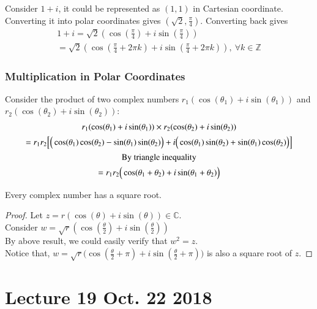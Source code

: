 \documentclass[10pt]{article}
\begin{document}
		\begin{example}
			Consider $1+i$, it could be represented as $(1,1)$ in Cartesian coordinate. Converting it into polar coordinates gives $(\sqrt{2}, \frac{\pi}{4})$. Converting back gives
			\begin{gather*}
				1 + i = \sqrt{2}(\cos(\frac{\pi}{4}) + i \sin(\frac{\pi}{4})) \\
				= \sqrt{2} (\cos(\frac{\pi}{4} + 2\pi k) + i \sin(\frac{\pi}{4} + 2 \pi k)),\ \forall k \in \mathbb{Z}
			\end{gather*}
		\end{example}
		
		\subsubsection{Multiplication in Polar Coordinates}
		\par Consider the product of two complex numbers $r_1 (\cos(\theta_1) + i \sin(\theta_1))$ and $r_2 (\cos(\theta_2) + i \sin(\theta_2))$:
		\begin{gather*}
			r_1 (\cos(\theta_1) + i \sin(\theta_1)) \times r_2 (\cos(\theta_2) + i \sin(\theta_2)) \\
			= r_1 r_2 \Big[
				\Big(\cos(\theta_1) \cos(\theta_2)
				 - \sin(\theta_1) \sin(\theta_2) \Big) + 
				 i \Big(
				 	\cos(\theta_1)\sin(\theta_2) + \sin(\theta_1) \cos(\theta_2)
				 \Big)
				\Big] \\
			\text{{By triangle inequality}} \\
			= r_1 r_2 \Big ( \cos(\theta_1 + \theta_2) + i \sin(\theta_1 + \theta_2)\Big)
		\end{gather*}
		
		\begin{example}
			Every complex number has a square root.
			\begin{proof}
				Let $z = r(\cos(\theta) + i \sin(\theta)) \in \mathbb{C}$. \\
				Consider $w = \sqrt{r} (\cos(\frac{\theta}{2}) + i \sin(\frac{\theta}{2}))$ \\
				By above result, we could easily verify that $w^2 = z$. \\
				Notice that, $w = \sqrt{r}\Big(\cos(\frac{\theta}{2} + \pi) + i \sin(\frac{\theta}{2} + \pi) \Big)$ is also a square root of $z$.
			\end{proof}
		\end{example}
	
	\section{Lecture 19 Oct. 22 2018}
\end{document}
